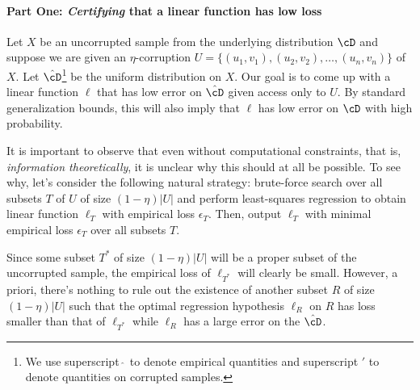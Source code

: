 \paragraph{Part One: \emph{Certifying} that a linear function has low loss}


Let $X$ be an uncorrupted sample from the underlying distribution $\cD$ and suppose we are given an $\eta$-corruption $U = \{(u_1,v_1), (u_2,v_2), \ldots, (u_n,v_n)\}$ of $X$. Let $\hat{\cD}$\footnote{We use superscript $\hat{\;}$ to denote empirical quantities and superscript $'$ to denote quantities on corrupted samples.} be the uniform distribution on $X$. Our goal is to come up with a linear function $\ell$ that has low error on $\hat{\cD}$ given access only to $U$. By standard generalization bounds, this will also imply that $\ell$ has low error on $\cD$ with high probability. 

It is important to observe that even without computational constraints, that is, \emph{information theoretically}, it is unclear why this should at all be possible. To see why, 
let's consider the following natural strategy: brute-force search over all subsets $T$ of $U$ of size
$(1 - \eta) |U|$ and perform least-squares regression to obtain linear
function $\ell_T$ with empirical loss $\epsilon_T$.  Then,
output $\ell_T$ with minimal empirical loss $\epsilon_T$ over all
subsets $T$.  

Since some subset $T^{*}$ of size $(1-\eta)|U|$ will be a proper subset of the uncorrupted sample, the empirical loss of $\ell_{T^{*}}$ will clearly be small. However, a priori, there's nothing to rule out the existence of another subset $R$ of size $(1-\eta)|U|$ such that the optimal regression hypothesis $\ell_R$ on $R$ has loss smaller than that of $\ell_{T^{*}}$ while $\ell_R$ has a large error on the $\hat{\cD}$. %
%

